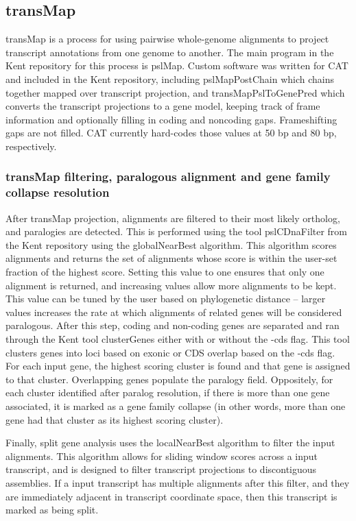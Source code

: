 \documentclass[fleqn,10pt]{wlscirep}
\begin{document}
\subsection*{transMap}
	transMap  \citep{stanke2008using,zhu2007comparative} is a process for using pairwise whole-genome alignments to project transcript annotations from one genome to another. The main program in the Kent repository for this process is pslMap. Custom software was written for CAT and included in the Kent repository, including pslMapPostChain which chains together mapped over transcript projection, and transMapPslToGenePred which converts the transcript projections to a gene model, keeping track of frame information and optionally filling in coding and noncoding gaps. Frameshifting gaps are not filled. CAT currently hard-codes those values at 50 bp and 80 bp, respectively.
  
\subsubsection*{transMap filtering, paralogous alignment and gene family collapse resolution}
	After transMap projection, alignments are filtered to their most likely ortholog, and paralogies are detected. This is performed using the tool pslCDnaFilter from the Kent repository using the globalNearBest algorithm. This algorithm scores alignments and returns the set of alignments whose score is within the user-set fraction of the highest score. Setting this value to one ensures that only one alignment is returned, and increasing values allow more alignments to be kept. This value can be tuned by the user based on phylogenetic distance -- larger values increases the rate at which alignments of related genes will be considered paralogous. After this step, coding and non-coding genes are separated and ran through the Kent tool clusterGenes either with or without the -cds flag. This tool clusters genes into loci based on exonic or CDS overlap based on the -cds flag. For each input gene, the highest scoring cluster is found and that gene is assigned to that cluster. Overlapping genes populate the paralogy field. Oppositely, for each cluster identified after paralog resolution, if there is more than one gene associated, it is marked as a gene family collapse (in other words, more than one gene had that cluster as its highest scoring cluster).
    
    Finally, split gene analysis uses the localNearBest algorithm to filter the input alignments. This algorithm allows for sliding window scores across a input transcript, and is designed to filter transcript projections to discontiguous assemblies. If a input transcript has multiple alignments after this filter, and they are immediately adjacent in transcript coordinate space, then this transcript is marked as being split.
\end{document}
